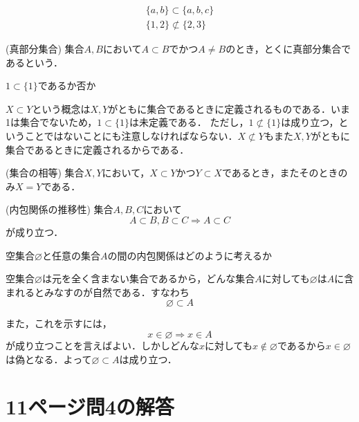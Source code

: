 \documentclass[a4j]{jsarticle}
\begin{document}
\begin{align}
	\{a, b\} \subset \{a, b, c\}\\
	\{1, 2 \} \not\subset \{2, 3\}
\end{align}

\medskip

\begin{itembox}[l]{ (真部分集合)}
集合$A, B$において$ A \subset B でかつ A \neq B$のとき，とくに真部分集合であるという．
\end{itembox}

 $1 \subset \{1\}$であるか否か

$X \subset Y$という概念は$X, Y$がともに集合であるときに定義されるものである．いま1は集合でないため，$1 \subset \{1\}$は未定義である．
ただし，$1 \not\subset \{1\}$は成り立つ，ということではないことにも注意しなければならない．$X \not\subset Y$もまた$X, Y$がともに集合であるときに定義されるからである．

\medskip

\begin{itembox}[l]{ (集合の相等)}
集合$X, Y$において，$X \subset Y$かつ$Y \subset X$であるとき，またそのときのみ$X = Y$である．
\end{itembox}

\medskip

\begin{itembox}[l]{ (内包関係の推移性)}
	集合$A,B,C$において
	\begin{equation}
		A \subset B, B \subset C \Rightarrow A \subset C
	\end{equation}
	が成り立つ．
\end{itembox}

 空集合$\varnothing$と任意の集合$A$の間の内包関係はどのように考えるか

空集合$\varnothing$は元を全く含まない集合であるから，どんな集合$A$に対しても$\varnothing$は$A$に含まれるとみなすのが自然である．すなわち\[\varnothing \subset A\]

また，これを示すには，\[x \in \varnothing \Rightarrow x \in A\]が成り立つことを言えばよい．しかしどんな$x$に対しても$x \not\in \varnothing$であるから$x \in \varnothing$は偽となる．よって$\varnothing \subset A$は成り立つ．

\section{11ページ問4の解答}
\end{document}
